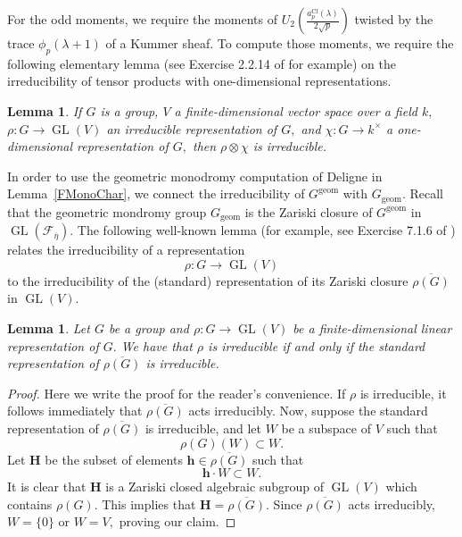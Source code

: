 \documentclass[12pt]{amsart}
\newtheorem{lemma}[theorem]{Lemma}
\theoremstyle{definition}
\theoremstyle{remark}
\numberwithin{equation}{section}
\DeclareMathOperator{\geom}{geom}
\DeclareMathOperator{\GL}{GL}
\DeclareMathOperator{\Cl}{Cl}
\begin{document}
For the odd moments, we require the moments of $U_2\left(\frac{a_p^{\Cl}(\lambda)}{2\sqrt{p}}\right)$ twisted by the trace $\phi_p(\lambda+1)$ of a Kummer sheaf. To compute those moments, we require the following elementary lemma (see Exercise 2.2.14 of \cite{KowalskiRep} for example) on the irreducibility of tensor products with one-dimensional representations.

\begin{lemma}\label{twistIrreducibility}
    If $G$ is a group, $V$ a finite-dimensional vector space over a field $k,$  $\rho:G\to\GL(V)$ an irreducible representation of $G,$ and $\chi:G\to k^\times$ a one-dimensional representation of $G,$ then $\rho\otimes\chi$ is irreducible.
\end{lemma}

In order to use the geometric monodromy computation of Deligne in Lemma~\ref{FMonoChar}, we connect the irreducibility of $G^{\geom}$ with $G_{\geom}.$
Recall that the geometric mondromy group $G_{\geom}$ is the Zariski closure of $G^{\geom}$ in $\GL(\mathcal{F}_{\overline{\eta}}).$ The following well-known lemma (for example, see Exercise 7.1.6 of \cite{KowalskiRep}) relates the irreducibility of a representation
$$
\rho: G\to\GL(V)
$$
to the irreducibility of the (standard) representation of its Zariski closure $\overline{\rho(G)}$ in $\GL(V).$

\begin{lemma}\label{RepZar}
    Let $G$ be a group and $\rho:G\to\GL(V)$ be a finite-dimensional linear representation of $G.$ We have that $\rho$ is irreducible if and only if the standard representation of $\overline{\rho(G)}$ is irreducible.
\end{lemma}

\begin{proof}
    Here we write the proof for the reader's convenience.
    If $\rho$ is irreducible, it follows immediately that $\overline{\rho(G)}$ acts irreducibly. Now, suppose the standard representation of $\overline{\rho(G)}$ is irreducible, and let $W$ be a subspace of $V$ such that 
    $$
    \rho(G)(W)\subset W.
    $$
    Let $\mathbf{H}$ be the subset of elements $\mathbf{h}\in\overline{\rho(G)}$ such that
    $$
    \mathbf{h}\cdot W\subset W.
    $$
    It is clear that $\mathbf{H}$ is a Zariski closed algebraic subgroup of $\GL(V)$ which contains $\rho(G).$ This implies that $\mathbf{H}=\overline{\rho(G)}.$ Since $\overline{\rho(G)}$ acts irreducibly, $W=\{0\}$ or $W=V,$ proving our claim.
\end{proof}
\end{document}

